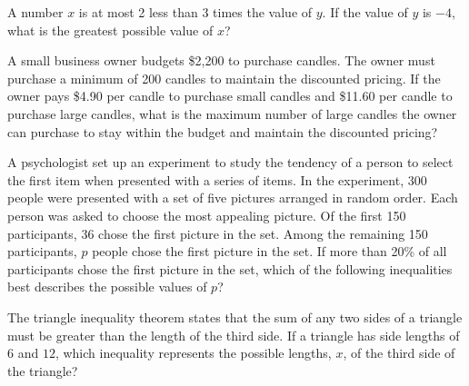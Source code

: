 A number \( x \) is at most 2 less than 3 times the value of \( y \). If the value of \( y \) is \( -4 \), what is the greatest possible value of \( x \)?


\vspace{5em}

\noindent\markforreview

\vspace{1em}

A small business owner budgets \$2{,}200 to purchase candles. The owner must purchase a minimum of 200 candles to maintain the discounted pricing. If the owner pays \$4.90 per candle to purchase small candles and \$11.60 per candle to purchase large candles, what is the maximum number of large candles the owner can purchase to stay within the budget and maintain the discounted pricing?

\newpage

\noindent\markforreview

\vspace{1em}

A psychologist set up an experiment to study the tendency of a person to select the first item when presented with a series of items. In the experiment, 300 people were presented with a set of five pictures arranged in random order. Each person was asked to choose the most appealing picture. Of the first 150 participants, 36 chose the first picture in the set. Among the remaining 150 participants, $p$ people chose the first picture in the set. If more than 20\% of all participants chose the first picture in the set, which of the following inequalities best describes the possible values of $p$?

\vspace{0.75em}


\vspace{2em}

\noindent\markforreview

\vspace{1em}

The triangle inequality theorem states that the sum of any two sides of a triangle must be greater than the length of the third side. If a triangle has side lengths of $6$ and $12$, which inequality represents the possible lengths, $x$, of the third side of the triangle?

